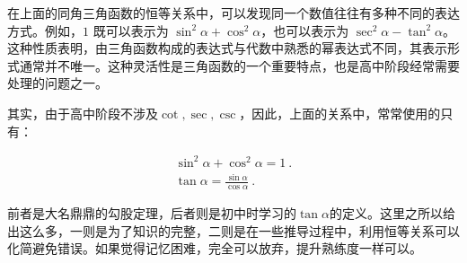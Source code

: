 在上面的同角三角函数的恒等关系中，可以发现同一个数值往往有多种不同的表达方式。例如，$1$ 既可以表示为 $\sin^2\alpha+\cos^2\alpha$，也可以表示为 $\sec^2\alpha-\tan^2\alpha$。这种性质表明，由三角函数构成的表达式与代数中熟悉的幂表达式不同，其表示形式通常并不唯一。这种灵活性是三角函数的一个重要特点，也是高中阶段经常需要处理的问题之一。

其实，由于高中阶段不涉及$\cot,\sec,\csc$，因此，上面的关系中，常常使用的只有：

\begin{gather}
\sin ^{2} \alpha + \cos ^{2}\alpha =1~.\\
\tan \alpha= \frac{\sin \alpha}{\cos \alpha}~.
\end{gather}

前者是大名鼎鼎的勾股定理，后者则是初中时学习的$\tan\alpha$的定义。这里之所以给出这么多，一则是为了知识的完整，二则是在一些推导过程中，利用恒等关系可以化简避免错误。如果觉得记忆困难，完全可以放弃，提升熟练度一样可以。

